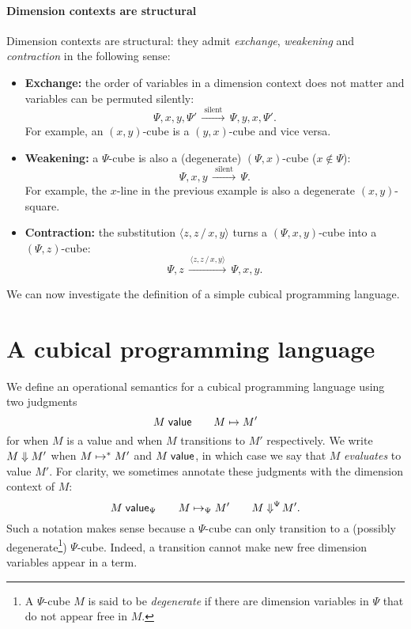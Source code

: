 \documentclass{article}
\begin{document}
\paragraph{Dimension contexts are structural}
  Dimension contexts are structural: they admit 
  \emph{exchange}, \emph{weakening} and \emph{contraction} in the following sense:
  \begin{itemize}
  \item \textbf{Exchange:} the order of variables in a dimension
    context does not matter and variables can be permuted silently:
    \[ \Psi, x, y, \Psi' \,\xrightarrow{\text{ silent }}\, \Psi, y, x, \Psi'.  \] 
    For example, an $(x,y)$-cube is a $(y,x)$-cube and vice versa.
  \item \textbf{Weakening:} 
    a $\Psi$-cube is also a (degenerate) $(\Psi, x)$-cube ($x \notin \Psi$):
    \[ \Psi, x, y \,\xrightarrow{\text{ silent }}\, \Psi.  \]
    For example, the $x$-line in the previous example is also a degenerate
    $(x, y)$-square.
  \item \textbf{Contraction:}
    the substitution $\langle z,z \,/\, x,y \rangle$ turns a $(\Psi, x, y)$-cube
    into a $(\Psi, z)$-cube:
    \[ \Psi, z \,\xrightarrow{\,\langle z,z \,/\, x,y \rangle\,}\, \Psi, x, y.  \]
  \end{itemize}

We can now investigate the definition of a simple cubical programming language.


\section{A cubical programming language}


We define an operational semantics for a cubical programming
language using two judgments
\[ M\;\mathsf{value} \qquad M \mapsto M' \] for when $M$ is a value and when
$M$ transitions to $M'$ respectively.  We write $M \mathrel{\Downarrow} M'$ when
$M \mapsto^* M'$ and $M\;\mathsf{value}$, in which case we say that $M$
\emph{evaluates} to value $M'$. For clarity, we sometimes annotate these
judgments with the dimension context of $M$:
\[ M\;\mathsf{value}_{\Psi} \qquad M \mapsto_{\Psi} M' \qquad
  M \mathrel{\Downarrow}^{\Psi}\! M'.  \] Such a notation makes sense because a
$\Psi$-cube can only transition to a (possibly degenerate\footnote{A
  $\Psi$-cube $M$ is said to be \emph{degenerate} if there are
  dimension variables in $\Psi$ that do not appear free in
  $M$.})  $\Psi$-cube. Indeed, a transition cannot make
new free dimension variables appear in a term.
\end{document}
